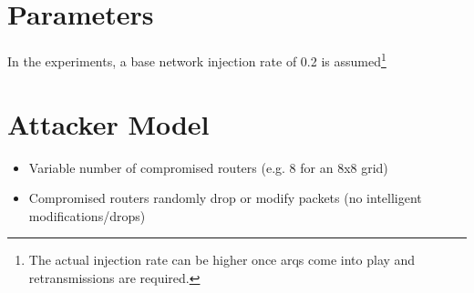 \section{Parameters}
In the experiments, a base network injection rate of 0.2 is assumed\footnote{The actual injection rate can be higher once \glspl{arq} come into play
and retransmissions are required.}

\section{Attacker Model}
\begin{itemize}
    \item Variable number of compromised routers (e.g. 8 for an 8x8 grid)
    \item Compromised routers randomly drop or modify packets (no intelligent modifications/drops)
\end{itemize}

